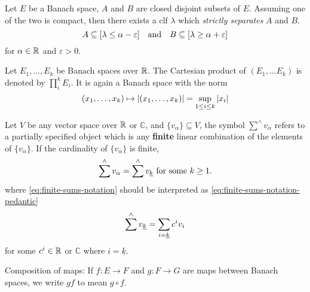 \documentclass[../main-manifolds.tex]{subfiles}
\begin{document}
\begin{wts}\label{prop:hahn-banach-geometric-form}
    Let $E$ be a Banach space, $A$ and $B$ are closed disjoint subsets of $E$. Assuming one of the two is compact, then there exists a clf $\lambda$ which \emph{strictly separates} $A$ and $B$. 
    \begin{equation}\label{eq:hahn-banach-geometric-form}
        A\subseteq [\lambda \leq \alpha-\varepsilon]\qqtext{and} B\subseteq [\lambda\geq\alpha + \varepsilon]
    \end{equation}
    for $\alpha\in\mathbb{R}$ and $\varepsilon>0$.
\end{wts}


\begin{definition}\label{def:finite-product-banach-space}
    Let $E_1,\ldots, E_k$ be Banach spaces over $\mathbb{R}$. The Cartesian product of $(E_1,\ldots E_k)$ is denoted by $\prod_i^k E_i$. It is again a Banach space with the norm
    \begin{equation}\label{eq:finite-product-banach-space-norm}
        (x_1,\ldots, x_k)\mapsto \abs{(x_1,\ldots, x_k)} = \sup_{1 \leq i\leq k}\abs{x_i}
    \end{equation}
\end{definition}

Let $V$ be any vector space over $\mathbb{R}$ or $\mathbb{C}$, and $\{v_{\alpha}\}\subseteq V$, the symbol $\sum^{\wedge}v_\alpha$ refers to a partially specified object which is any \textbf{finite} linear combination of the elements of $\{v_{\alpha}\}$. If the cardinality of $\{v_{\alpha}\}$ is finite, 
\begin{equation}\label{eq:finite-sums-notation}
\sum^\wedge v_{\alpha} = \sum^\wedge\UL{v}[k]\text{ for some $k\geq 1$.}        
\end{equation}
where \cref{eq:finite-sums-notation} should be interpreted as \cref{eq:finite-sums-notation-pedantic}
\begin{equation}\label{eq:finite-sums-notation-pedantic}
    \sum^\wedge\UL{v}[k] = \sum_{i=\underline{k}}c^iv_i
\end{equation}
for some $c^i\in\mathbb{R}$ or $\mathbb{C}$ where $i=\underline{k}$. 

Composition of maps: If $f: E\to F$ and $g: F\to G$ are maps between Banach spaces, we write $gf$ to mean $g\circ f$. \\
\end{document}
